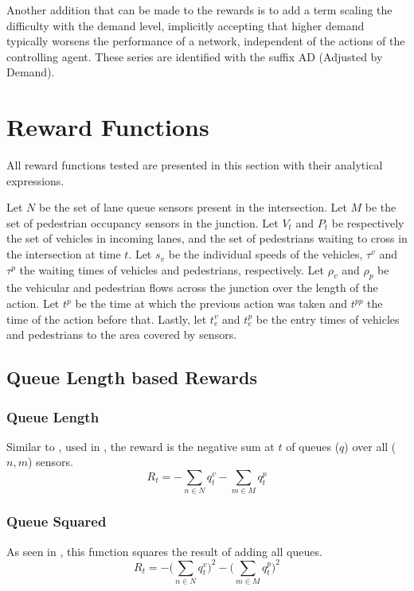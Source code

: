 \documentclass[a4paper, conference]{IEEEtran}
\begin{document}
Another addition that can be made to the rewards is to add a term scaling the difficulty with the demand level, implicitly accepting that higher demand typically worsens the performance of a network, independent of the actions of the controlling agent.
These series are identified with the suffix AD (Adjusted by Demand).
\section{Reward Functions}
\label{rewards}
All reward functions tested are presented in this section with their analytical expressions.

Let $N$ be the set of lane queue sensors present in the intersection.
Let $M$ be the set of pedestrian occupancy sensors in the junction.
Let $V_t$ and $P_t$ be respectively the set of vehicles in incoming lanes, and the set of pedestrians waiting to cross in the intersection at time $t$. 
Let $s_v$ be the individual speeds of the vehicles, $\tau^v$ and $\tau^p$ the waiting times of vehicles and pedestrians, respectively.
Let $\rho_v$ and $\rho_p$ be the vehicular and pedestrian flows across the junction over the length of the action.
Let $t^p$ be the time at which the previous action was taken and $t^{pp}$ the time of the action before that.
Lastly, let $t^v_e$ and $t^p_e$ be the entry times of vehicles and pedestrians to the area covered by sensors. 

\subsection{Queue Length based Rewards}
\subsubsection{Queue Length}
Similar to \cite{pra2010}, used in \cite{aslani2019}, the reward is the negative sum at $t$ of queues ($q$) over all ($n,m$) sensors.
\begin{equation}
    R_t = - \sum_{n \in N} q^v_{t} - \sum_{m \in M} q^p_{t}
\label{eq:queue}
\end{equation}

\subsubsection{Queue Squared}
As seen in \cite{gendersthesis}, this function squares the result of adding all queues.
\begin{equation}
   R_t = -  \bigg( \sum_{n \in N} q^v_{t} \bigg)^2 - \bigg( \sum_{m \in M} q^p_{t} \bigg)^2
\label{eq:queuesq} 
\end{equation}
\end{document}
